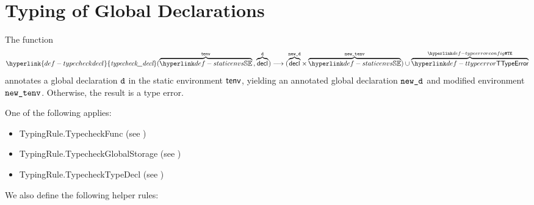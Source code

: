\documentclass{book}
\newcommand\ProseOtherwiseTypeError[0]{Otherwise, the result is a type error.}
\newcommand\typecheckdecl[0]{\hyperlink{def-typecheckdecl}{\textfunc{typecheck\_decl}}}
\begin{document}
\chapter{Typing of Global Declarations}
\hypertarget{def-typecheckdecl}{}
The function
\[
  \typecheckdecl(
    \overname{\staticenvs}{\tenv} \aslsep
    \overname{\decl}{\vd}
  )
  \aslto (\overname{\decl}{\newd} \times \overname{\staticenvs}{\newtenv})
  \cup \overname{\TTypeError}{\TypeErrorConfig}
\]
annotates a global declaration $\texttt{d}$ in the static environment $\textsf{tenv}$,
yielding an annotated global declaration $\texttt{new\_d}$ and modified environment $\texttt{new\_tenv}$.
\ProseOtherwiseTypeError

One of the following applies:
\begin{itemize}
  \item TypingRule.TypecheckFunc (see )
  \item TypingRule.TypecheckGlobalStorage (see )
  \item TypingRule.TypecheckTypeDecl (see )
\end{itemize}
We also define the following helper rules:
\end{document}
